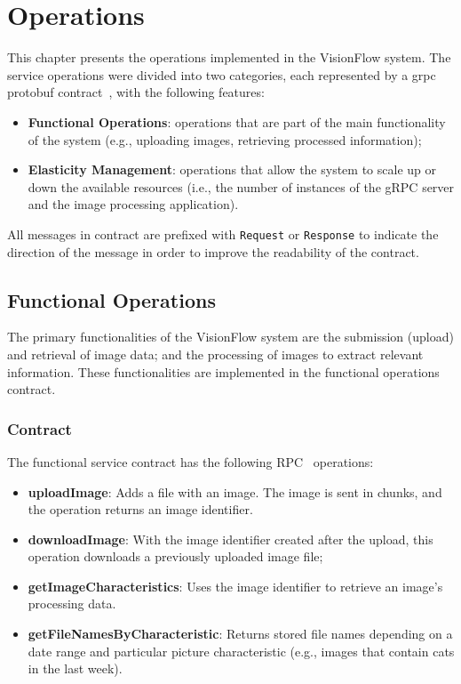 \chapter{Operations}\label{ch:operations}

This chapter presents the operations implemented in the VisionFlow system.
The service operations were divided into two categories, each represented by a grpc protobuf contract~\cite{grpc-protobuf}, with the following features:

\begin{itemize}
    \item \textbf{Functional Operations}: operations that are part of the main functionality of the system (e.g., uploading images, retrieving processed information);
    \item \textbf{Elasticity Management}: operations that allow the system to scale up or down the available resources (i.e., the number of instances of the gRPC server and the image processing application).
\end{itemize}

All messages in contract are prefixed with \texttt{Request} or \texttt{Response}
to indicate the direction of the message in order to improve the readability of the contract.


\section{Functional Operations}\label{sec:functional_operations}

The primary functionalities of the VisionFlow system are the submission (upload) and retrieval of image data;
and the processing of images to extract relevant information.
These functionalities are implemented in the functional operations contract.

\subsection{Contract}\label{subsec:functional-operations-contract}

The functional service contract has the following RPC~\cite{rpc-protocol} operations:

\begin{itemize}
    \item \textbf{uploadImage}: Adds a file with an image.
    The image is sent in chunks, and the operation returns an image identifier.
    \item \textbf{downloadImage}: With the image identifier created after the upload,
    this operation downloads a previously uploaded image file;
    \item \textbf{getImageCharacteristics}: Uses the image identifier to retrieve an image's processing data.
    \item \textbf{getFileNamesByCharacteristic}:
    Returns stored file names depending on a date range and particular picture characteristic
    (e.g., images that contain cats in the last week).
\end{itemize}

